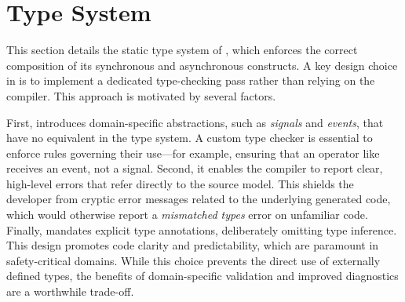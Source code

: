 \section{Type System}
\label{sec:grust:typing}

This section details the static type system of \GRust, which enforces the correct composition
of its synchronous and asynchronous constructs. A key design choice in \GRust is to implement a
dedicated type-checking pass rather than relying on the \Rust compiler. This approach is motivated
by several factors.

First, \GRust introduces domain-specific abstractions, such as \emph{signals} and \emph{events},
that have no equivalent in the \Rust type system. A custom type checker is essential to enforce
rules governing their use---for example, ensuring that an operator like  receives an
event, not a signal.
%
Second, it enables the compiler to report clear, high-level errors that refer directly to the source
\GRust model. This shields the developer from cryptic error messages related to the underlying
generated code, which would otherwise report a \emph{mismatched types} error on unfamiliar code.
%
Finally, \GRust mandates explicit type annotations, deliberately omitting type inference. This
design promotes code clarity and predictability, which are paramount in safety-critical domains.
While this choice prevents the direct use of externally defined \Rust types, the benefits of
domain-specific validation and improved diagnostics are a worthwhile trade-off.

